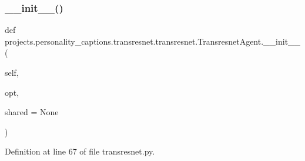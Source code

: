 \subsubsection{\texorpdfstring{\+\_\+\+\_\+init\+\_\+\+\_\+()}{\_\_init\_\_()}}
{\footnotesize\ttfamily def projects.\+personality\+\_\+captions.\+transresnet.\+transresnet.\+Transresnet\+Agent.\+\_\+\+\_\+init\+\_\+\+\_\+ (\begin{DoxyParamCaption}\item[{}]{self,  }\item[{}]{opt,  }\item[{}]{shared = {\ttfamily None} }\end{DoxyParamCaption})}



Definition at line 67 of file transresnet.\+py.


